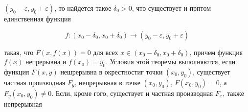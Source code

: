 \documentclass[10pt]{article}
\begin{document}
$\left(y_{0}-\varepsilon, y_{0}+\varepsilon\right)$, то найдется такое $\delta_{0}>0$, что существует и прптом единственная функция



\[

f:\left(x_{0}-\delta_{0}, x_{0}+\delta_{0}\right) \longrightarrow\left(y_{0}-\varepsilon, y_{0}+\varepsilon\right)

\]



такая, что $F(x, f(x))=0$ для всех $x \in\left(x_{0}-\delta_{0}, x_{0}+\delta_{0}\right)$, причем функция $f(x)$ непрерывна и $f\left(x_{0}\right)=y_{0}$. Условия этой теоремы выполняются, если функция $F(x, y)$ нешрерывна в окрестностиг точки $\left(x_{0}, y_{0}\right)$, существует частная производная $F_{y}$, непрерывная в точке $\left(x_{0}, y_{0}\right)$, $F\left(x_{0}, y_{0}\right)=0$, а $F_{y}\left(x_{0}, y_{0}\right) \neq 0$. Если, кроме гого, существует и частная производная $F_{x}$, также непрерывная
\end{document}
